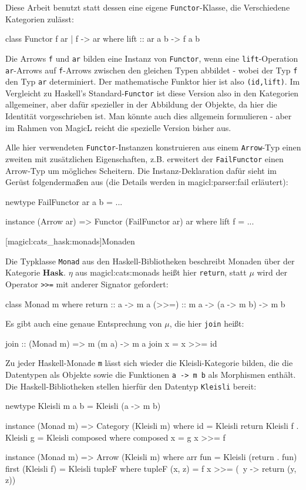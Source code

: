\documentclass[a4paper, bibgerm]{book}
\newcommand\icode[1]{\lstinline?#1?}
\newcommand\lsubsection{}
\newcommand\sref{}
\begin{document}
Diese Arbeit benutzt statt dessen eine eigene \icode{Functor}-Klasse,
die Verschiedene Kategorien zulässt:
\begin{code}
class Functor f ar | f -> ar where
  lift :: ar a b -> f a b
\end{code}
Die Arrows \icode{f} und \icode{ar} bilden eine Instanz von
\icode{Functor}, wenn eine \icode{lift}-Operation \icode{ar}-Arrows auf
\icode{f}-Arrows zwischen den gleichen Typen abbildet - wobei der Typ
\icode{f} den Typ \icode{ar} determiniert. Der mathematische Funktor
hier ist also \icode{(id,lift)}. Im Vergleicht zu Haskell's
Standard-\icode{Functor} ist diese Version also in den Kategorien
allgemeiner, aber dafür spezieller in der Abbildung der Objekte, da hier
die Identität vorgeschrieben ist. Man könnte auch dies allgemein
formulieren - aber im Rahmen von MagicL reicht die spezielle Version
bisher aus.

Alle hier verwendeten \icode{Functor}-Instanzen konstruieren aus einem
\icode{Arrow}-Typ einen zweiten mit zusätzlichen Eigenschaften,
z.B. erweitert der \icode{FailFunctor} einen Arrow-Typ um mögliches
Scheitern. Die Instanz-Deklaration dafür sieht im Gerüst folgendermaßen
aus (die Details werden in \sref{magicl:parser:fail} erläutert):
\begin{code}
newtype FailFunctor ar a b = ...

instance (Arrow ar) => Functor (FailFunctor ar) ar where
  lift f = ...
\end{code}

\lsubsection[magicl:cats_hask:monads]{Monaden}

Die Typklasse \icode{Monad} aus den Haskell-Bibliotheken beschreibt
Monaden über der Kategorie $\mathbf{Hask}$. $\eta$ aus
\sref{magicl:cats:monads} heißt hier \icode{return}, statt $\mu$ wird der
Operator \icode{>>=} %
mit anderer Signator gefordert:
\begin{code}
class Monad m where
  return :: a -> m a
  (>>=)  :: m a -> (a -> m b) -> m b
\end{code} %
Es gibt auch eine genaue Entsprechung von $\mu$, die hier \icode{join}
heißt:
\begin{code}
join :: (Monad m) => m (m a) -> m a
join x = x >>= id
\end{code} %

Zu jeder Haskell-Monade \icode{m} lässt sich wieder die
Kleisli-Kategorie bilden, die die Datentypen als Objekte sowie die
Funktionen \icode{a -> m b} als Morphismen enthält. Die
Haskell-Bibliotheken stellen hierfür den Datentyp \icode{Kleisli}
bereit:
\begin{code}
newtype Kleisli m a b = Kleisli (a -> m b)

instance (Monad m) => Category (Kleisli m) 
  where id = Kleisli return
        Kleisli f . Kleisli g = Kleisli composed
          where composed x = g x >>= f

instance (Monad m) => Arrow (Kleisli m) 
  where arr fun = Kleisli (return . fun)
        first (Kleisli f) = Kleisli tupleF
          where tupleF (x, z) = f x >>= (\ y -> return (y, z))
\end{code} %
\end{document}
